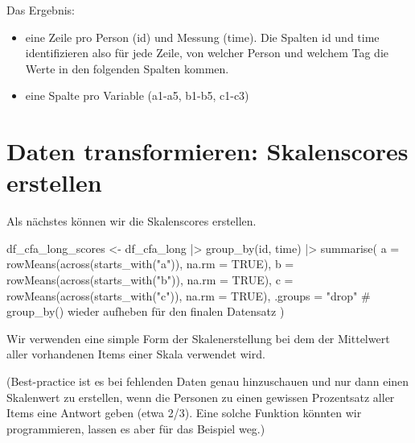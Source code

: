 \documentclass[
  letterpaper,
  DIV=11,
  numbers=noendperiod]{scrreprt}
\newenvironment{Shaded}{\begin{snugshade}}{\end{snugshade}}
\newcommand{\AttributeTok}[1]{\textcolor[rgb]{0.40,0.45,0.13}{#1}}
\newcommand{\CommentTok}[1]{\textcolor[rgb]{0.37,0.37,0.37}{#1}}
\newcommand{\ConstantTok}[1]{\textcolor[rgb]{0.56,0.35,0.01}{#1}}
\newcommand{\FunctionTok}[1]{\textcolor[rgb]{0.28,0.35,0.67}{#1}}
\newcommand{\NormalTok}[1]{\textcolor[rgb]{0.00,0.23,0.31}{#1}}
\newcommand{\OtherTok}[1]{\textcolor[rgb]{0.00,0.23,0.31}{#1}}
\newcommand{\SpecialCharTok}[1]{\textcolor[rgb]{0.37,0.37,0.37}{#1}}
\newcommand{\StringTok}[1]{\textcolor[rgb]{0.13,0.47,0.30}{#1}}
\providecommand{\tightlist}{%
  \setlength{\itemsep}{0pt}\setlength{\parskip}{0pt}}\usepackage{longtable,booktabs,array}
\begin{document}
Das Ergebnis:

\begin{itemize}
\tightlist
\item
  eine Zeile pro Person (id) und Messung (time). Die Spalten id und time
  identifizieren also für jede Zeile, von welcher Person und welchem Tag
  die Werte in den folgenden Spalten kommen.
\item
  eine Spalte pro Variable (a1-a5, b1-b5, c1-c3)
\end{itemize}

\section{Daten transformieren: Skalenscores
erstellen}\label{daten-transformieren-skalenscores-erstellen}

Als nächstes können wir die Skalenscores erstellen.

\begin{Shaded}
\begin{Highlighting}[]
\NormalTok{df\_cfa\_long\_scores }\OtherTok{\textless{}{-}}\NormalTok{ df\_cfa\_long }\SpecialCharTok{|\textgreater{}} \FunctionTok{group\_by}\NormalTok{(id, time) }\SpecialCharTok{|\textgreater{}} 
  \FunctionTok{summarise}\NormalTok{(}
    \AttributeTok{a =} \FunctionTok{rowMeans}\NormalTok{(}\FunctionTok{across}\NormalTok{(}\FunctionTok{starts\_with}\NormalTok{(}\StringTok{"a"}\NormalTok{)), }\AttributeTok{na.rm =} \ConstantTok{TRUE}\NormalTok{),}
    \AttributeTok{b =} \FunctionTok{rowMeans}\NormalTok{(}\FunctionTok{across}\NormalTok{(}\FunctionTok{starts\_with}\NormalTok{(}\StringTok{"b"}\NormalTok{)), }\AttributeTok{na.rm =} \ConstantTok{TRUE}\NormalTok{),}
    \AttributeTok{c =} \FunctionTok{rowMeans}\NormalTok{(}\FunctionTok{across}\NormalTok{(}\FunctionTok{starts\_with}\NormalTok{(}\StringTok{"c"}\NormalTok{)), }\AttributeTok{na.rm =} \ConstantTok{TRUE}\NormalTok{),}
    \AttributeTok{.groups =} \StringTok{"drop"} \CommentTok{\# group\_by() wieder aufheben für den finalen Datensatz}
\NormalTok{  )}
\end{Highlighting}
\end{Shaded}

Wir verwenden eine simple Form der Skalenerstellung bei dem der
Mittelwert aller vorhandenen Items einer Skala verwendet wird.

(Best-practice ist es bei fehlenden Daten genau hinzuschauen und nur
dann einen Skalenwert zu erstellen, wenn die Personen zu einen gewissen
Prozentsatz aller Items eine Antwort geben (etwa 2/3). Eine solche
Funktion könnten wir programmieren, lassen es aber für das Beispiel
weg.)
\end{document}

